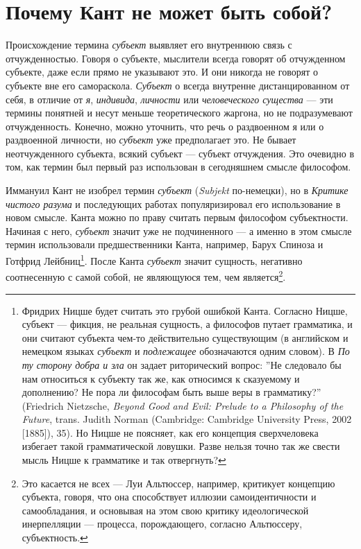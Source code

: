 \documentclass[12pt]{book}
\begin{document}
\section{Почему Кант не может быть собой?}

Происхождение термина \textit{субъект} выявляет его внутреннюю связь с отчужденностью. Говоря о субъекте, мыслители всегда говорят об отчужденном субъекте, даже если прямо не указывают это. И они никогда не говорят о субъекте вне его самораскола. \textit{Субъект} о всегда внутренне дистанцированном от себя, в отличие от \textit{я}, \textit{индивида}, \textit{личности} или \textit{человеческого существа} --- эти термины понятней и несут меньше теоретического жаргона, но не подразумевают отчужденность. Конечно, можно уточнить, что речь о раздвоенном я или о раздвоенной личности, но \textit{субъект} уже предполагает это. Не бывает неотчужденного субъекта, всякий субъект --- субъект отчуждения. Это очевидно в том, как термин был первый раз использован в сегодняшнем смысле философом.

Иммануил Кант не изобрел термин \textit{субъект} (\textit{Subjekt} по-немецки), но в \textit{Критике чистого разума} и последующих работах популяризировал его использование в новом смысле. Канта можно по праву считать первым философом субъектности. Начиная с него, \textit{субъект} значит уже не подчиненного --- а именно в этом смысле термин использовали предшественники Канта, например, Барух Спиноза и Готфрид Лейбниц\footnote{Фридрих Ницше будет считать это грубой ошибкой Канта. Согласно Ницше, субъект --- фикция, не реальная сущность, а философов путает грамматика, и они считают субъекта чем-то действительно существующим (в английском и немецком языках \textit{субъект} и \textit{подлежащее} обозначаются одним словом). В \textit{По ту сторону добра и зла} он задает риторический вопрос: ''Не следовало бы нам относиться к субъекту так же, как относимся к сказуемому и дополнению? Не пора ли философам быть выше веры в грамматику?'' (Friedrich Nietzsche, \textit{Beyond Good and Evil: Prelude to a Philosophy of the Future}, trans. Judith Norman (Cambridge: Cambridge University Press, 2002 [1885]), 35). Но Ницше не поясняет, как его концепция сверхчеловека избегает такой грамматической ловушки. Разве нельзя точно так же свести мысль Ницше к грамматике и так отвергнуть?}. После Канта \textit{субъект} значит сущность, негативно соотнесенную с самой собой, не являющуюся тем, чем является\footnote{Это касается не всех --- Луи Альтюссер, например, критикует концепцию субъекта, говоря, что она способствует иллюзии самоидентичности и самообладания, и основывая на этом свою критику идеологической инерпелляции --- процесса, порождающего, согласно Альтюссеру, субъектность.}.
\end{document}
